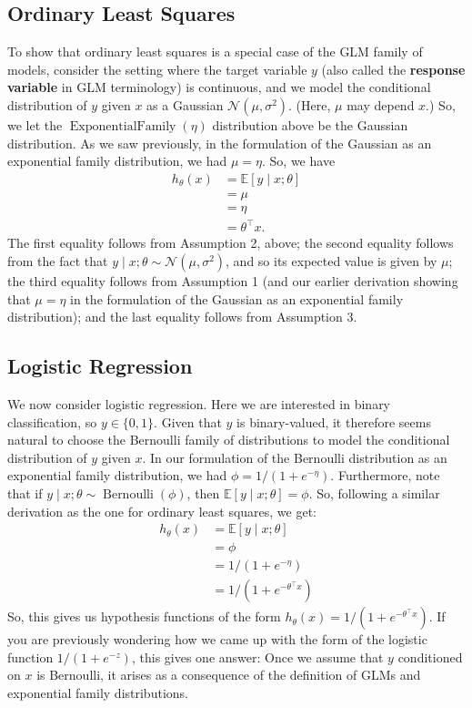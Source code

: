 \subsection{Ordinary Least Squares}
To show that ordinary least squares is a special case of the GLM family
of models, consider the setting where the target variable $y$ (also called the
\textbf{response variable} in GLM terminology) is continuous, and we model the
conditional distribution of $y$ given $x$ as a Gaussian $\mathcal N(\mu,\sigma^2)$. (Here, $\mu$ may
depend $x$.) So, we let the $\operatorname{ExponentialFamily}(\eta)$ distribution above be
the Gaussian distribution. As we saw previously, in the formulation of the
Gaussian as an exponential family distribution, we had $\mu = \eta$. So, we have
\begin{align*}
    h_\theta (x) &= \mathbb E[y \mid x;\theta]\\
    &= \mu\\
    &= \eta\\
    &= \theta^\top x.
\end{align*}
The first equality follows from Assumption 2, above; the second equality
follows from the fact that $y \mid x;\theta \sim \mathcal N(\mu,\sigma^2)$, and so its expected value is given
by $\mu$; the third equality follows from Assumption 1 (and our earlier derivation
showing that $\mu = \eta$ in the formulation of the Gaussian as an exponential
family distribution); and the last equality follows from Assumption 3.

\subsection{Logistic Regression}
We now consider logistic regression. Here we are interested in binary classification,
so $y \in \{0,1\}$. Given that $y$ is binary-valued, it therefore seems natural
to choose the Bernoulli family of distributions to model the conditional distribution
of $y$ given $x$. In our formulation of the Bernoulli distribution as
an exponential family distribution, we had $\phi = 1/(1 + e^{-\eta})$. Furthermore,
note that if $y \mid x;\theta \sim \operatorname{Bernoulli}(\phi)$, then $\mathbb E[y \mid x;\theta] = \phi$. So, following a similar
derivation as the one for ordinary least squares, we get:
\begin{align*}
    h_\theta (x) &= \mathbb E[y \mid x;\theta]\\
    &= \phi\\
    &= 1/(1 + e^{-\eta})\\
    &= 1/(1 + e^{-\theta^\top x})    
\end{align*}
So, this gives us hypothesis functions of the form $h_\theta (x) = 1/(1 + e^{-\theta^\top x})$. If
you are previously wondering how we came up with the form of the logistic
function $1/(1 + e^{-z})$, this gives one answer: Once we assume that $y$ conditioned
on $x$ is Bernoulli, it arises as a consequence of the definition of GLMs
and exponential family distributions.

